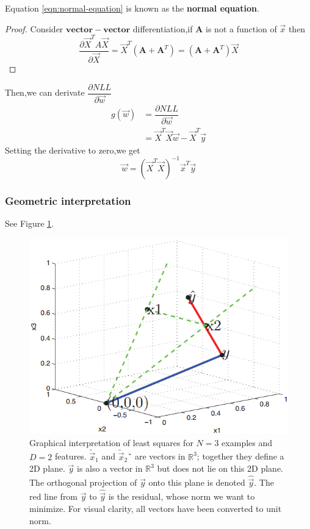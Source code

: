 \documentclass[]{article}
\begin{document}
Equation \ref{eqn:normal-equation} is known as the \textbf{normal equation}.
\begin{proof}
	Consider $\mathbf{vector-vector}$ differentiation,if $\mathbf{A}$ is not a function of $\vec{x}$ then
	\begin{equation}
	\dfrac{\partial\vec{X}^TA\vec{X}}{\partial\vec{X}} = \vec{X}^T(\mathbf{A}+\mathbf{A}^T) = (\mathbf{A}+\mathbf{A}^T)\vec{X}
	\end{equation}
\end{proof}
Then,we can derivate $\dfrac{\partial NLL}{\partial \vec{w}}$
\begin{eqnarray}
g(\vec{w}) &= \dfrac{\partial NLL}{\partial\vec{w}} \\
&=\vec{X}^T\vec{X}\vec{w} - \vec{X}^T\vec{y}			
\end{eqnarray}
Setting the derivative to zero,we get
\begin{equation}
\vec{w} = (\vec{X}^T\vec{X})^{-1}\vec{x}^T\vec{y}
\end{equation}

\subsubsection{Geometric interpretation}

See Figure \ref{fig:graphical-interpretation-of-OLS}.
\begin{figure}[hbtp]
	\centering
	\includegraphics[scale=.50]{graphical-interpretation-of-OLS.png}
	\caption{Graphical interpretation of least squares for $N=3$ examples and $D=2$ features. $\tilde{\vec{x}}_1$ and $\tilde{\vec{x}}_2$˜ are vectors in $\mathbb{R}^3$; together they define a 2D plane. $\vec{y}$ is also a vector in $\mathbb{R}^3$ but does not lie on this 2D plane. The orthogonal projection of $\vec{y}$ onto this plane is denoted $\hat{\vec{y}}$. The red line from $\vec{y}$ to $\hat{\vec{y}}$ is the residual, whose norm we want to minimize. For visual clarity, all vectors have been converted to unit norm.}
	\label{fig:graphical-interpretation-of-OLS} 
\end{figure}
\end{document}
